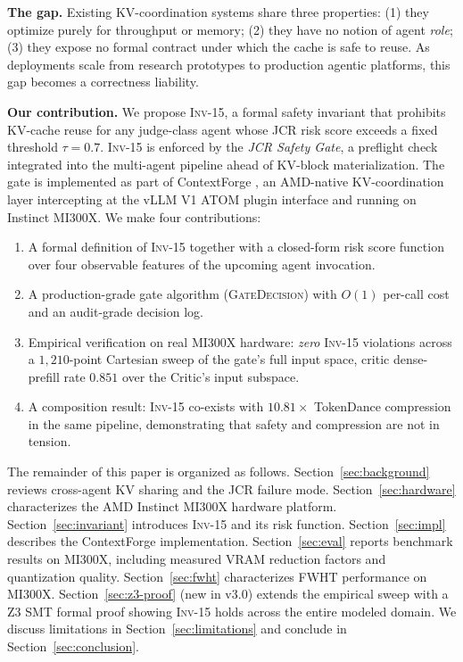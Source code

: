\documentclass[10pt,twocolumn]{article}
\newcommand{\INV}[1]{\textsc{Inv-#1}}
\newcommand{\GateDecision}{\textsc{GateDecision}}
\begin{document}
\textbf{The gap.} Existing KV-coordination systems share three properties:
(1) they optimize purely for throughput or memory; (2) they have no notion
of agent \emph{role}; (3) they expose no formal contract under which the
cache is safe to reuse. As deployments scale from research prototypes to
production agentic platforms, this gap becomes a correctness liability.

\textbf{Our contribution.} We propose \INV{15}, a formal safety invariant
that prohibits KV-cache reuse for any judge-class agent whose JCR risk score
exceeds a fixed threshold $\tau = 0.7$. \INV{15} is enforced by the
\emph{JCR Safety Gate}, a preflight check integrated into the multi-agent
pipeline ahead of KV-block materialization. The gate is implemented as part
of ContextForge \cite{contextforge}, an AMD-native KV-coordination layer
intercepting at the vLLM V1 ATOM plugin interface and running on Instinct
MI300X. We make four contributions:
\begin{enumerate}
  \item A formal definition of \INV{15} together with a closed-form risk
        score function over four observable features of the upcoming agent
        invocation.
  \item A production-grade gate algorithm (\GateDecision) with $O(1)$
        per-call cost and an audit-grade decision log.
  \item Empirical verification on real MI300X hardware: \emph{zero}
        \INV{15} violations across a $1{,}210$-point Cartesian sweep of
        the gate's full input space, critic dense-prefill rate $0.851$
        over the Critic's input subspace.
  \item A composition result: \INV{15} co-exists with $10.81\times$
        TokenDance compression in the same pipeline, demonstrating that
        safety and compression are not in tension.
\end{enumerate}

The remainder of this paper is organized as follows.
Section~\ref{sec:background} reviews cross-agent KV sharing and the JCR
failure mode. Section~\ref{sec:hardware} characterizes the AMD Instinct MI300X
hardware platform. Section~\ref{sec:invariant} introduces \INV{15} and its
risk function. Section~\ref{sec:impl} describes the ContextForge
implementation. Section~\ref{sec:eval} reports benchmark results on MI300X,
including measured VRAM reduction factors and quantization quality.
Section~\ref{sec:fwht} characterizes FWHT performance on MI300X.
Section~\ref{sec:z3-proof} (new in v3.0) extends the empirical sweep
with a Z3 SMT formal proof showing \INV{15} holds across the entire
modeled domain. We discuss limitations in
Section~\ref{sec:limitations} and conclude in
Section~\ref{sec:conclusion}.
\end{document}
